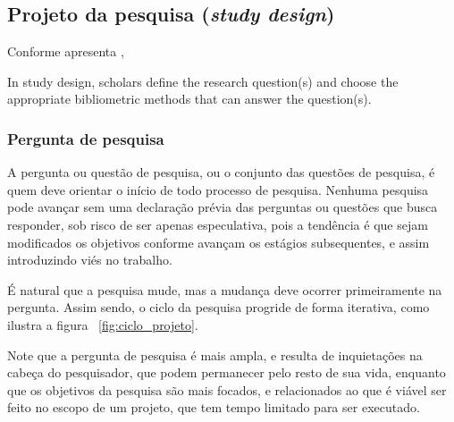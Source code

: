 \subsection{Projeto da pesquisa (\textit{study design})} 

Conforme apresenta \cite[p. 960]{aria_bibliometrix_2017},

\begin{itquote}
    In study design, scholars define the research question(s) and choose the appropriate bibliometric methods that can
answer the question(s).
\end{itquote}

\subsubsection{Pergunta de pesquisa}
A pergunta ou questão de pesquisa, ou o conjunto das questões de pesquisa, é quem deve orientar o início de todo processo de pesquisa. Nenhuma pesquisa pode avançar sem uma declaração prévia das perguntas ou questões que busca responder, sob risco de ser apenas especulativa, pois a tendência é que sejam modificados os objetivos conforme avançam os estágios subsequentes, e assim introduzindo viés no trabalho.


É natural que a pesquisa mude, mas a mudança deve ocorrer primeiramente na pergunta. Assim sendo, o ciclo da pesquisa progride de forma iterativa, como ilustra a figura ~\ref{fig:ciclo_projeto}.

Note que a pergunta de pesquisa é mais ampla, e resulta de inquietações na cabeça do pesquisador, que podem permanecer pelo resto de sua vida, enquanto que os objetivos da pesquisa são mais focados, e relacionados ao que é viável ser feito no escopo de um projeto, que tem tempo limitado para ser executado.


